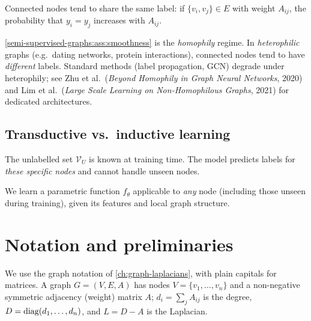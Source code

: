 \begin{notechapter}
\begin{assumption}
\label{semi-supervised-graphs:ass:smoothness}
Connected nodes tend to share the same label: if $\{v_i, v_j\} \in E$ with
weight $A_{ij}$, the probability that $y_i = y_j$ increases with $A_{ij}$.
\end{assumption}

\begin{remark}
\label{semi-supervised-graphs:rem:heterophily}
\cref{semi-supervised-graphs:ass:smoothness} is the \emph{homophily} regime. In
\emph{heterophilic} graphs (e.g.\ dating networks, protein interactions),
connected nodes tend to have \emph{different} labels. Standard methods (label
propagation, GCN) degrade under heterophily; see Zhu et al.\ (\emph{Beyond Homophily in Graph Neural Networks}, 2020) and Lim et al.\ (\emph{Large Scale Learning on Non-Homophilous Graphs}, 2021) for dedicated architectures.
\end{remark}

\subsection{Transductive vs.\ inductive learning}

\begin{definition}
The unlabelled set $\mathcal{V}_U$ is known at training time. The model
predicts labels for \emph{these specific nodes} and cannot handle unseen nodes.
\end{definition}

\begin{definition}
We learn a parametric function $f_\theta$ applicable to \emph{any} node
(including those unseen during training), given its features and local graph
structure.
\end{definition}

\section{Notation and preliminaries}
\label{semi-supervised-graphs:sec:prelim}

We use the graph notation of \cref{ch:graph-laplacians}, with plain capitals for matrices. A graph $G = (V, E, A)$ has nodes $V = \{v_1, \ldots, v_n\}$ and a non-negative symmetric adjacency (weight) matrix $A$; $d_i = \sum_jA_{ij}$ is the degree, $D = \operatorname{diag}(d_1, \ldots, d_n)$, and $L = D - A$ is the Laplacian.


\end{notechapter}
